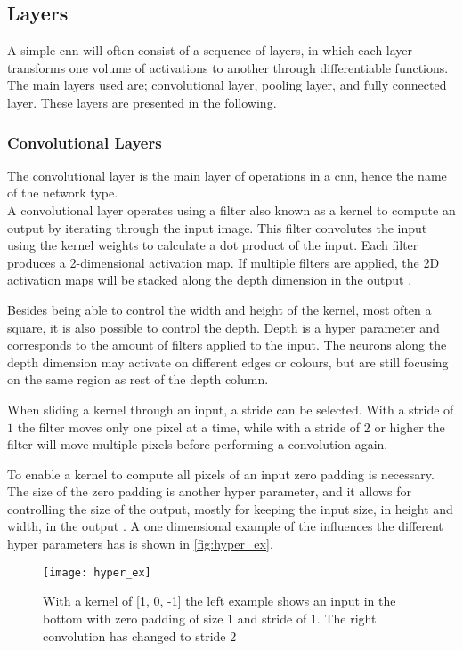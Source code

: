 \subsection{Layers}
A simple \gls{cnn} will often consist of a sequence of layers, in which each layer transforms one volume of activations to another through differentiable functions. The main layers used are; convolutional layer, pooling layer, and fully connected layer. These layers are presented in the following.

\subsubsection{Convolutional Layers}
The convolutional layer is the main layer of operations in a \gls{cnn}, hence the name of the network type.\\

A convolutional layer operates using a filter also known as a kernel to compute an output by iterating through the input image. This filter convolutes the input using the kernel weights to calculate a dot product of the input. Each filter produces a 2-dimensional activation map. If multiple filters are applied, the 2D activation maps will be stacked along the depth dimension in the output .

Besides being able to control the width and height of the kernel, most often a square, it is also possible to control the depth. Depth is a hyper parameter and corresponds to the amount of filters applied to the input. The neurons along the depth dimension may activate on different edges or colours, but are still focusing on the same region as rest of the depth column.

When sliding a kernel through an input, a stride can be selected. With a stride of $1$ the filter moves only one pixel at a time, while with a stride of $2$ or higher the filter will move multiple pixels before performing a convolution again.

To enable a kernel to compute all pixels of an input zero padding is necessary. The size of the zero padding is another hyper parameter, and it allows for controlling the size of the output, mostly for keeping the input size, in height and width, in the output \citep{Karpathy2016b}. A one dimensional example of the influences the different hyper parameters has is shown in \autoref{fig:hyper_ex}.

\begin{figure}[H]
	\centering
	\texttt{[image: hyper\_ex]}
	\caption{With a kernel of [1, 0, -1] the left example shows an input in the bottom with zero padding of size 1 and stride of 1. The right convolution has changed to stride 2 \citep{Karpathy2016b}}
	\label{fig:hyper_ex}
\end{figure}

